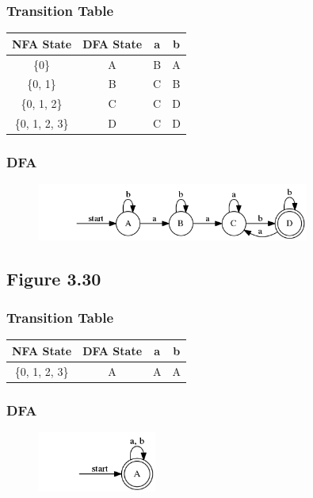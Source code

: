 \documentclass[paper=a4, fontsize=11pt]{scrartcl} %
\numberwithin{equation}{section} %
\numberwithin{figure}{section} %
\numberwithin{table}{section} %
\begin{document}
\subsubsection*{Transition Table}
\begin{table}[H]
\centering
\begin{tabular}{|c|c|c|c|}
\hline
NFA State & DFA State & a & b \\
\hline
\{0\} & A & B & A \\
\hline
\{0, 1\} & B & C & B \\
\hline
\{0, 1, 2\} & C & C & D \\
\hline
\{0, 1, 2, 3\} & D & C & D \\
\hline
\end{tabular}
\end{table}
\subsubsection*{DFA}
\begin{figure}[H]
\centering
\includegraphics[width=0.8\textwidth]{1_2.png}
\label{fig:1_2}
\end{figure}

\subsection{Figure 3.30}
\subsubsection*{Transition Table}
\begin{table}[H]
\centering
\begin{tabular}{|c|c|c|c|}
\hline
NFA State & DFA State & a & b \\
\hline
\{0, 1, 2, 3\} & A & A & A \\
\hline
\end{tabular}
\end{table}
\subsubsection*{DFA}
\begin{figure}[H]
\centering
\includegraphics[width=0.35\textwidth]{1_3.png}
\label{fig:1_3}
\end{figure}
\end{document}
